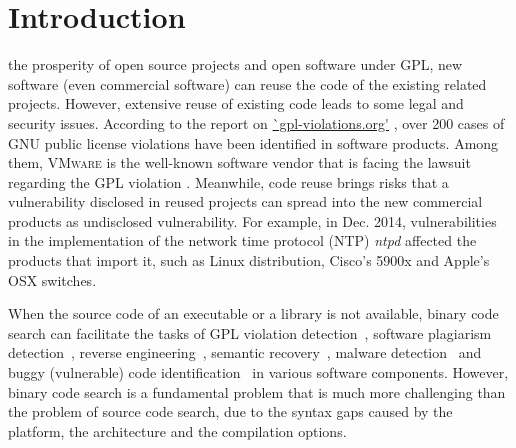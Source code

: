 \section{Introduction}\label{sec:info}


 the prosperity of open source projects and open software under GPL, new software (even commercial software) can reuse the code of the existing related projects. However, extensive reuse of existing code leads to some legal and security issues. According to the report on \url{`gpl-violations.org'} \cite{gpl_vio}, over 200 cases of GNU public license violations  have been identified in software products. Among them, \textsc{VMware} is the well-known software vendor that is facing the lawsuit regarding the GPL violation \cite{vm_news}. Meanwhile, code reuse brings risks that a vulnerability disclosed in reused projects can spread into the
new commercial products as undisclosed vulnerability. For example, in Dec. 2014,  vulnerabilities in the implementation of the network time protocol (NTP) \emph{ntpd} affected the products that import it, such as Linux distribution, Cisco's 5900x and Apple's OSX switches. %


When the source code of an executable or a library   is not available, binary code search can facilitate the tasks of GPL violation detection~\cite{DBLP:conf/msr/HemelKVD11}, software plagiarism detection~\cite{luo2014semantics,cop-tse}, reverse engineering~\cite{caballero2009binary}, semantic recovery~\cite{kim2014reuse}, malware detection~\cite{ming2015memoized} and buggy (vulnerable) code identification~\cite{DBLP:conf/sp/PewnyGGRH15,DBLP:conf/pldi/DavidY14,vuddy} in various software components.
However, binary code search is a fundamental problem that is much more challenging than the problem of source code search, due to the syntax gaps caused by the platform, the architecture and the compilation options.

